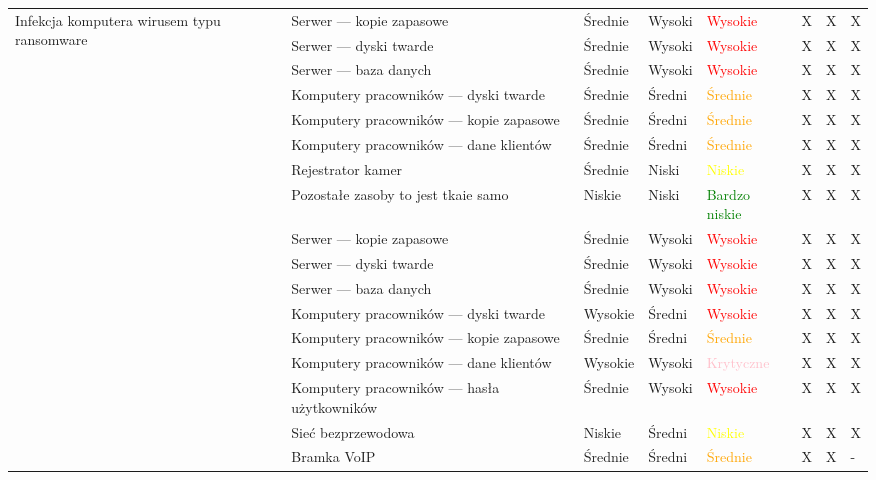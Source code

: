 \begin{landscape}
\begin{longtable}[ht!]{|m{3cm}|m{6cm}|m{4.5cm}|m{3cm}|m{3cm}|m{0.5cm}|m{0.5cm}|m{0.5cm}|}
		\hline
		\multirow{8}{4cm}{Infekcja komputera wirusem typu ransomware}
		& Serwer --- kopie zapasowe & Średnie & Wysoki & \textcolor{red}{Wysokie}& X & X & X  \\ \cline{2-8} \cline{2-5}
		& Serwer --- dyski twarde & Średnie & Wysoki & \textcolor{red}{Wysokie} & X & X & X  \\ \cline{2-8}
		& Serwer --- baza danych & Średnie & Wysoki & \textcolor{red}{Wysokie} & X & X & X  \\ \cline{2-8}
		& Komputery pracowników --- dyski twarde & Średnie & Średni & \textcolor{orange}{Średnie} & X & X & X  \\ \cline{2-8}
		& Komputery pracowników --- kopie zapasowe & Średnie & Średni & \textcolor{orange}{Średnie} & X & X & X  \\ \cline{2-8}
		& Komputery pracowników --- dane klientów & Średnie & Średni & \textcolor{orange}{Średnie} & X & X & X  \\ \cline{2-8}
		& Rejestrator kamer & Średnie & Niski & \textcolor{yellow}{Niskie} & X & X & X  \\ \cline{2-8}
		& Pozostałe zasoby to jest tkaie samo & Niskie & Niski & \textcolor{green}{Bardzo niskie} & X & X & X  \\ \cline{2-8}
		\hline 
		\newpage
		\hline
		\multirow{11}{4cm}{Szkodliwe oprogramowanie} 
		& Serwer --- kopie zapasowe & Średnie & Wysoki & \textcolor{red}{Wysokie} & X & X & X  \\ \cline{2-8}
		& Serwer --- dyski twarde & Średnie & Wysoki & \textcolor{red}{Wysokie} & X & X & X  \\ \cline{2-8}
		& Serwer --- baza danych & Średnie & Wysoki & \textcolor{red}{Wysokie} & X & X & X  \\ \cline{2-8}
		& Komputery pracowników --- dyski twarde & Wysokie & Średni & \textcolor{red}{Wysokie} & X & X & X  \\ \cline{2-8}
		& Komputery pracowników --- kopie zapasowe & Średnie & Średni & \textcolor{orange}{Średnie} & X & X & X  \\ \cline{2-8}
		& Komputery pracowników --- dane klientów & Wysokie & Wysoki & \textcolor{pink}{Krytyczne}& X & X & X  \\ \cline{2-8}
		& Komputery pracowników --- hasła użytkowników & Średnie & Wysoki & \textcolor{red}{Wysokie} & X & X & X  \\ \cline{2-8}
		& Sieć bezprzewodowa & Niskie & Średni & \textcolor{yellow}{Niskie} & X & X & X  \\ \cline{2-8}
		& Bramka VoIP & Średnie & Średni & \textcolor{orange}{Średnie} & X & X & - \\ \cline{2-8}

\end{longtable}
\end{landscape}

